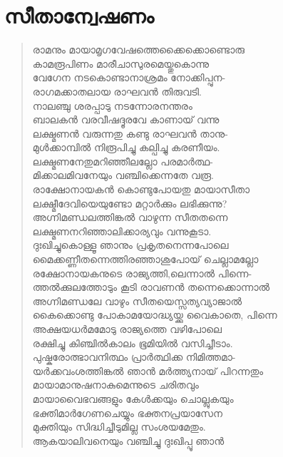 \section{സീതാന്വേഷണം}

\begin{verse}
രാമനും മായാമൃഗവേഷത്തെക്കൈക്കൊണ്ടൊരു\\
കാമരൂപിണം മാരീചാസുരമെയ്തുകൊന്നു\\
വേഗേന നടകൊണ്ടാനാശ്രമം നോക്കിപ്പുന-\\
രാഗമക്കാതലായ രാഘവന്‍ തിരുവടി.\\
നാലഞ്ചു ശരപ്പാടു നടന്നോരനന്തരം\\
ബാലകന്‍ വരവീഷദ്ദൂരവേ കാണായ് വന്നു\\
ലക്ഷ്മണന്‍ വരുന്നതു കണ്ടു രാഘവന്‍ താനു-\\
മുള്‍ക്കാമ്പില്‍ നിരൂപിച്ചു കല്പിച്ചു കരണീയം.\\
ലക്ഷ്മണനേതുമറിഞ്ഞീലല്ലോ പരമാര്‍ത്ഥ-\\
മിക്കാലമിവനേയും വഞ്ചിക്കെന്നതേ വരൂ.\\
രാക്ഷോനായകന്‍ കൊണ്ടുപോയതു മായാസീതാ\\
ലക്ഷ്മീദേവിയെയുണ്ടോ മറ്റാര്‍ക്കും ലഭിക്കുന്നു?\\
അഗ്നിമണ്ഡലത്തിങ്കല്‍ വാഴുന്ന സീതതന്നെ\\
ലക്ഷ്മണനറിഞ്ഞാലിക്കാര്യവും വന്നുകൂടാ.\\
ദുഃഖിച്ചുകൊള്ളൂ ഞാനും പ്രകൃതനെന്നപോലെ\\
മൈക്കണ്ണീതന്നെത്തിരഞ്ഞാശുപോയ് ചെല്ലാമല്ലോ\\
രക്ഷോനായകനുടെ രാജ്യത്തി,ലെന്നാല്‍ പിന്നെ-\\
ത്തല്‍ക്കുലത്തോടും കൂടി രാവണന്‍ തന്നെക്കൊന്നാല്‍\\
അഗ്നിമണ്ഡലേ വാഴും സീതയെസ്സത്യവ്യാജാല്‍\\
കൈക്കൊണ്ടു പോകാമയോദ്ധ്യയ്ക്കു വൈകാതെ, പിന്നെ\\
അക്ഷയധര്‍മമോടു രാജ്യത്തെ വഴിപോലെ\\
രക്ഷിച്ചു കിഞ്ചില്‍കാലം ഭൂമിയില്‍ വസിച്ചീടാം.\\
പുഷ്കരോത്ഭാവനിത്ഥം പ്രാര്‍ത്ഥിക്ക നിമിത്തമാ-\\
യര്‍ക്കവംശത്തിങ്കല്‍ ഞാന്‍ മര്‍ത്ത്യനായ് പിറന്നതും\\
മായാമാനുഷനാകുമെന്നുടെ ചരിതവും\\
മായാവൈഭവങ്ങളും കേള്‍ക്കയും ചൊല്ലുകയും\\
ഭക്തിമാര്‍ഗേണചെയ്യും ഭക്തനപ്രയാസേന\\
മുക്തിയും സിദ്ധിച്ചീടുമില്ല സംശയമേതും.\\
ആകയാലിവനെയും വഞ്ചിച്ചു ദുഃഖിപ്പൂ ഞാന്‍\\

\end{verse}
